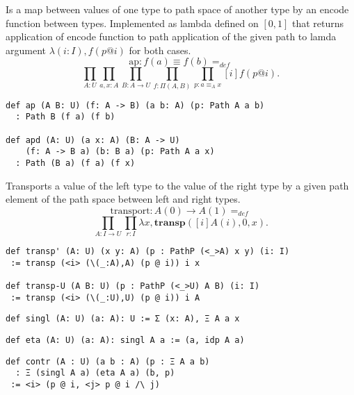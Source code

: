 \documentclass{article}
\begin{document}
\begin{theorem}[Congruence]
Is a map between values of one type
to path space of another type by an encode function between types.
Implemented as lambda defined on $[0,1]$ that returns
application of encode function to path application of
the given path to lamda argument $ \lambda (i:I), f (p @ i)$
for both cases.
$$
   \mathrm{ap} : f(a)\equiv f(b) =_{def}
$$
$$
   \prod_{A:U}\prod_{a,x:A}\prod_{B:A\rightarrow U}\prod_{f: \Pi(A,B)}\prod_{p:a\equiv_A x}[i] f(p@i).
$$
\begin{lstlisting}
def ap (A B: U) (f: A -> B) (a b: A) (p: Path A a b)
  : Path B (f a) (f b)

def apd (A: U) (a x: A) (B: A -> U)
    (f: A -> B a) (b: B a) (p: Path A a x)
  : Path (B a) (f a) (f x)
\end{lstlisting}
\end{theorem}

\begin{theorem}
Transports a value of the left type to the value of the right type
by a given path element of the path space between left and right types.
$$
  \mathrm{transport} : A(0) \rightarrow A(1) =_{def}
$$
$$
   \prod_{A:I\rightarrow U}\prod_{r:I} \lambda x,\mathbf{transp}([i]A(i),0,x).
$$
\begin{lstlisting}
def transp' (A: U) (x y: A) (p : PathP (<_>A) x y) (i: I)
 := transp (<i> (\(_:A),A) (p @ i)) i x

def transp-U (A B: U) (p : PathP (<_>U) A B) (i: I)
 := transp (<i> (\(_:U),U) (p @ i)) i A
\end{lstlisting}
\end{theorem}

\begin{definition}[Singleton]
\begin{lstlisting}
def singl (A: U) (a: A): U := Σ (x: A), Ξ A a x
\end{lstlisting}
\end{definition}

\begin{theorem}
\begin{lstlisting}
def eta (A: U) (a: A): singl A a := (a, idp A a)
\end{lstlisting}
\end{theorem}

\begin{theorem}
\begin{lstlisting}
def contr (A : U) (a b : A) (p : Ξ A a b)
  : Ξ (singl A a) (eta A a) (b, p)
 := <i> (p @ i, <j> p @ i /\ j)
\end{lstlisting}
\end{theorem}
\end{document}

